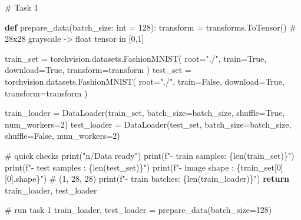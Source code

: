 \documentclass[
  letterpaper,
  DIV=11,
  numbers=noendperiod]{scrartcl}
\newenvironment{Shaded}{\begin{snugshade}}{\end{snugshade}}
\newcommand{\BuiltInTok}[1]{\textcolor[rgb]{0.00,0.23,0.31}{#1}}
\newcommand{\CommentTok}[1]{\textcolor[rgb]{0.37,0.37,0.37}{#1}}
\newcommand{\ControlFlowTok}[1]{\textcolor[rgb]{0.00,0.23,0.31}{\textbf{#1}}}
\newcommand{\DecValTok}[1]{\textcolor[rgb]{0.68,0.00,0.00}{#1}}
\newcommand{\KeywordTok}[1]{\textcolor[rgb]{0.00,0.23,0.31}{\textbf{#1}}}
\newcommand{\NormalTok}[1]{\textcolor[rgb]{0.00,0.23,0.31}{#1}}
\newcommand{\OperatorTok}[1]{\textcolor[rgb]{0.37,0.37,0.37}{#1}}
\newcommand{\SpecialCharTok}[1]{\textcolor[rgb]{0.37,0.37,0.37}{#1}}
\newcommand{\SpecialStringTok}[1]{\textcolor[rgb]{0.13,0.47,0.30}{#1}}
\newcommand{\StringTok}[1]{\textcolor[rgb]{0.13,0.47,0.30}{#1}}
\newcommand{\VariableTok}[1]{\textcolor[rgb]{0.07,0.07,0.07}{#1}}
\begin{document}
\begin{Shaded}
\begin{Highlighting}[]
\CommentTok{\# Task 1}

\KeywordTok{def}\NormalTok{ prepare\_data(batch\_size: }\BuiltInTok{int} \OperatorTok{=} \DecValTok{128}\NormalTok{):}
\NormalTok{    transform }\OperatorTok{=}\NormalTok{ transforms.ToTensor()  }\CommentTok{\# 28x28 grayscale {-}\textgreater{} float tensor in [0,1]}

\NormalTok{    train\_set }\OperatorTok{=}\NormalTok{ torchvision.datasets.FashionMNIST(}
\NormalTok{        root}\OperatorTok{=}\StringTok{"./"}\NormalTok{, train}\OperatorTok{=}\VariableTok{True}\NormalTok{, download}\OperatorTok{=}\VariableTok{True}\NormalTok{, transform}\OperatorTok{=}\NormalTok{transform}
\NormalTok{    )}
\NormalTok{    test\_set }\OperatorTok{=}\NormalTok{ torchvision.datasets.FashionMNIST(}
\NormalTok{        root}\OperatorTok{=}\StringTok{"./"}\NormalTok{, train}\OperatorTok{=}\VariableTok{False}\NormalTok{, download}\OperatorTok{=}\VariableTok{True}\NormalTok{, transform}\OperatorTok{=}\NormalTok{transform}
\NormalTok{    )}

\NormalTok{    train\_loader }\OperatorTok{=}\NormalTok{ DataLoader(train\_set, batch\_size}\OperatorTok{=}\NormalTok{batch\_size, shuffle}\OperatorTok{=}\VariableTok{True}\NormalTok{, num\_workers}\OperatorTok{=}\DecValTok{2}\NormalTok{)}
\NormalTok{    test\_loader  }\OperatorTok{=}\NormalTok{ DataLoader(test\_set,  batch\_size}\OperatorTok{=}\NormalTok{batch\_size, shuffle}\OperatorTok{=}\VariableTok{False}\NormalTok{, num\_workers}\OperatorTok{=}\DecValTok{2}\NormalTok{)}

    \CommentTok{\# quick checks}
    \BuiltInTok{print}\NormalTok{(}\StringTok{"n/Data ready"}\NormalTok{)}
    \BuiltInTok{print}\NormalTok{(}\SpecialStringTok{f"{-} train samples: }\SpecialCharTok{\{}\BuiltInTok{len}\NormalTok{(train\_set)}\SpecialCharTok{\}}\SpecialStringTok{"}\NormalTok{)}
    \BuiltInTok{print}\NormalTok{(}\SpecialStringTok{f"{-} test samples : }\SpecialCharTok{\{}\BuiltInTok{len}\NormalTok{(test\_set)}\SpecialCharTok{\}}\SpecialStringTok{"}\NormalTok{)}
    \BuiltInTok{print}\NormalTok{(}\SpecialStringTok{f"{-} image shape  : }\SpecialCharTok{\{}\NormalTok{train\_set[}\DecValTok{0}\NormalTok{][}\DecValTok{0}\NormalTok{]}\SpecialCharTok{.}\NormalTok{shape}\SpecialCharTok{\}}\SpecialStringTok{"}\NormalTok{)  }\CommentTok{\# (1, 28, 28)}
    \BuiltInTok{print}\NormalTok{(}\SpecialStringTok{f"{-} train batches: }\SpecialCharTok{\{}\BuiltInTok{len}\NormalTok{(train\_loader)}\SpecialCharTok{\}}\SpecialStringTok{"}\NormalTok{)}
    \ControlFlowTok{return}\NormalTok{ train\_loader, test\_loader}

\CommentTok{\# run task 1}
\NormalTok{train\_loader, test\_loader }\OperatorTok{=}\NormalTok{ prepare\_data(batch\_size}\OperatorTok{=}\DecValTok{128}\NormalTok{)}
\end{Highlighting}
\end{Shaded}
\end{document}

